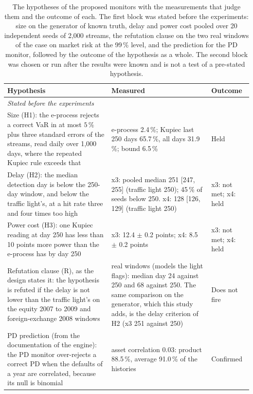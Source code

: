 \begin{table}[htbp]
\centering
\footnotesize
\setlength{\tabcolsep}{3pt}
\caption{The hypotheses of the proposed monitors with the measurements that judge them and the outcome of each. The first block was stated before the experiments: size on the generator of known truth, delay and power cost pooled over 20 independent seeds of 2,000 streams, the refutation clause on the two real windows of the case on market risk at the 99\,\% level, and the prediction for the PD monitor, followed by the outcome of the hypothesis as a whole. The second block was chosen or run after the results were known and is not a test of a pre-stated hypothesis.}
\label{tab:hypotheses}
\begin{tabular}{p{6.0cm}p{6.6cm}p{2.4cm}}
\toprule
Hypothesis & Measured & Outcome \\
\midrule
\multicolumn{3}{l}{\textit{Stated before the experiments}} \\
\relax Size (H1): the e-process rejects a correct VaR in at most $5\,\%$ plus three standard errors of the streams, read daily over 1,000 days, where the repeated Kupiec rule exceeds that & \relax e-process 2.4\,\%; Kupiec last 250 days 65.7\,\%, all days 31.9\,\%; bound 6.5\,\% & Held \\
\relax Delay (H2): the median detection day is below the 250-day window, and below the traffic light's, at a hit rate three and four times too high & \relax x3: pooled median 251 [247, 255] (traffic light 250); 45\,\% of seeds below 250. x4: 128 [126, 129] (traffic light 250) & \relax x3: not met; x4: held \\
\relax Power cost (H3): one Kupiec reading at day 250 has less than 10 points more power than the e-process has by day 250 & \relax x3: 12.4 $\pm$ 0.2 points; x4: 8.5 $\pm$ 0.2 points & \relax x3: not met; x4: held \\
\relax Refutation clause (R), as the design states it: the hypothesis is refuted if the delay is not lower than the traffic light's on the equity 2007 to 2009 and foreign-exchange 2008 windows & \relax real windows (models the light flags): median day 24 against 250 and 68 against 250. The same comparison on the generator, which this study adds, is the delay criterion of H2 (x3 251 against 250) & \relax Does not fire \\
\relax PD prediction (from the documentation of the engine): the PD monitor over-rejects a correct PD when the defaults of a year are correlated, because its null is binomial & \relax asset correlation 0.03: product 88.5\,\%, average 91.0\,\% of the histories & \relax Confirmed \\

\end{tabular}
\end{table}
